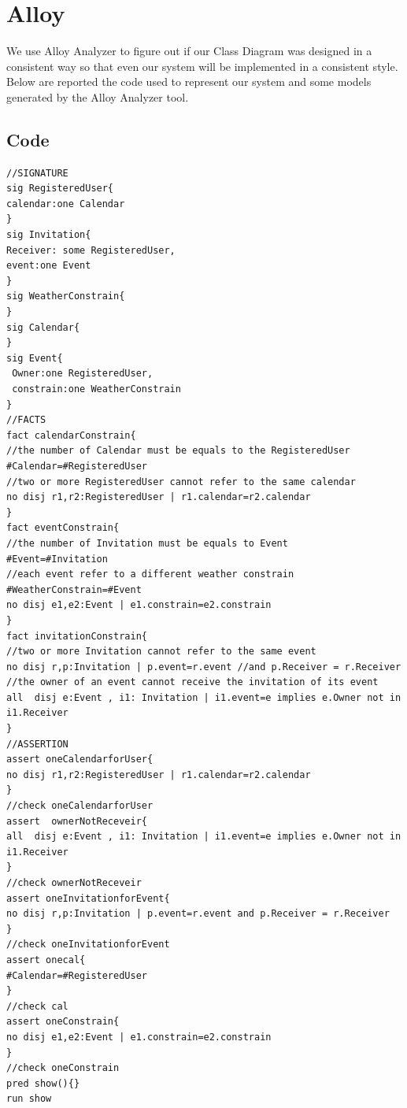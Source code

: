 \section{Alloy}
We use Alloy Analyzer to figure out if our Class Diagram was designed in a consistent way so that even our system will be implemented in a consistent style.\\
Below are reported the code used to represent our system and some models generated by the Alloy Analyzer tool.
\subsection{Code}
\singlespacing
\begin{lstlisting}[frame=single,caption=Alloy Analyzer code label=list:alloycode]
//SIGNATURE
sig RegisteredUser{
calendar:one Calendar
}
sig Invitation{
Receiver: some RegisteredUser,
event:one Event
}
sig WeatherConstrain{
}
sig Calendar{
}
sig Event{
 Owner:one RegisteredUser,
 constrain:one WeatherConstrain
}
//FACTS
fact calendarConstrain{
//the number of Calendar must be equals to the RegisteredUser
#Calendar=#RegisteredUser
//two or more RegisteredUser cannot refer to the same calendar
no disj r1,r2:RegisteredUser | r1.calendar=r2.calendar
}
fact eventConstrain{
//the number of Invitation must be equals to Event
#Event=#Invitation
//each event refer to a different weather constrain
#WeatherConstrain=#Event
no disj e1,e2:Event | e1.constrain=e2.constrain
}
fact invitationConstrain{
//two or more Invitation cannot refer to the same event 
no disj r,p:Invitation | p.event=r.event //and p.Receiver = r.Receiver
//the owner of an event cannot receive the invitation of its event
all  disj e:Event , i1: Invitation | i1.event=e implies e.Owner not in i1.Receiver
}
//ASSERTION
assert oneCalendarforUser{
no disj r1,r2:RegisteredUser | r1.calendar=r2.calendar
}
//check oneCalendarforUser
assert  ownerNotReceveir{
all  disj e:Event , i1: Invitation | i1.event=e implies e.Owner not in i1.Receiver 
}
//check ownerNotReceveir
assert oneInvitationforEvent{
no disj r,p:Invitation | p.event=r.event and p.Receiver = r.Receiver
}
//check oneInvitationforEvent
assert onecal{
#Calendar=#RegisteredUser
}
//check cal
assert oneConstrain{
no disj e1,e2:Event | e1.constrain=e2.constrain
}
//check oneConstrain
pred show(){} 
run show 
\end{lstlisting}
